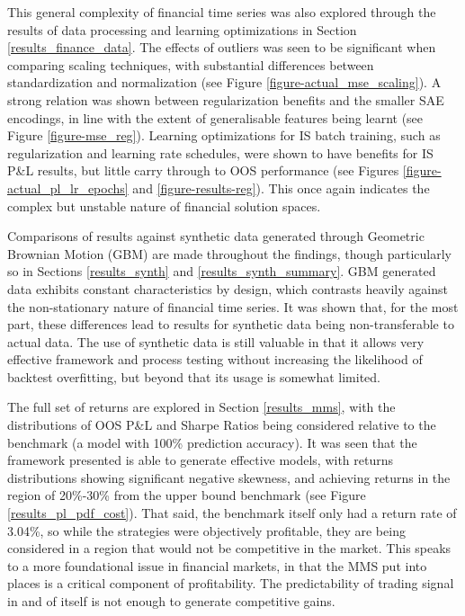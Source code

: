 \documentclass[a4paper,11pt,oneside]{article}
\theoremstyle{plain}
\theoremstyle{definition}
\begin{document}
	This general complexity of financial time series was also explored through the results of data processing and learning optimizations in Section \ref{results_finance_data}. The effects of outliers was seen to be significant when comparing scaling techniques, with substantial differences between standardization and normalization (see Figure \ref{figure-actual_mse_scaling}). A strong relation was shown between regularization benefits and the smaller SAE encodings, in line with the extent of generalisable features being learnt (see Figure \ref{figure-mse_reg}). Learning optimizations for IS batch training, such as regularization and learning rate schedules, were shown to have benefits for IS P\&L results, but little carry through to OOS performance (see Figures \ref{figure-actual_pl_lr_epochs} and \ref{figure-results-reg}). This once again indicates the complex but unstable nature of financial solution spaces.\newline	
	
	Comparisons of results against synthetic data generated through Geometric Brownian Motion (GBM) are made throughout the findings, though particularly so in Sections \ref{results_synth} and \ref{results_synth_summary}. GBM generated data exhibits constant characteristics by design, which contrasts heavily against the non-stationary nature of financial time series. It was shown that, for the most part, these differences lead to results for synthetic data being non-transferable to actual data. The use of synthetic data is still valuable in that it allows very effective framework and process testing without increasing the likelihood of backtest overfitting, but beyond that its usage is somewhat limited. \newline
	
	The full set of returns are explored in Section \ref{results_mms}, with the distributions of OOS P\&L and Sharpe Ratios being considered relative to the benchmark (a model with 100\% prediction accuracy). It was seen that the framework presented is able to generate effective models, with returns distributions showing significant negative skewness, and achieving returns in the region of 20\%-30\% from the upper bound benchmark (see Figure \ref{results_pl_pdf_cost}). That said, the benchmark itself only had a return rate of 3.04\%, so while the strategies were objectively profitable, they are being considered in a region that would not be competitive in the market. This speaks to a more foundational issue in financial markets, in that the MMS put into places is a critical component of profitability. The predictability of trading signal in and of itself is not enough to generate competitive gains.\newline
	
\end{document}
